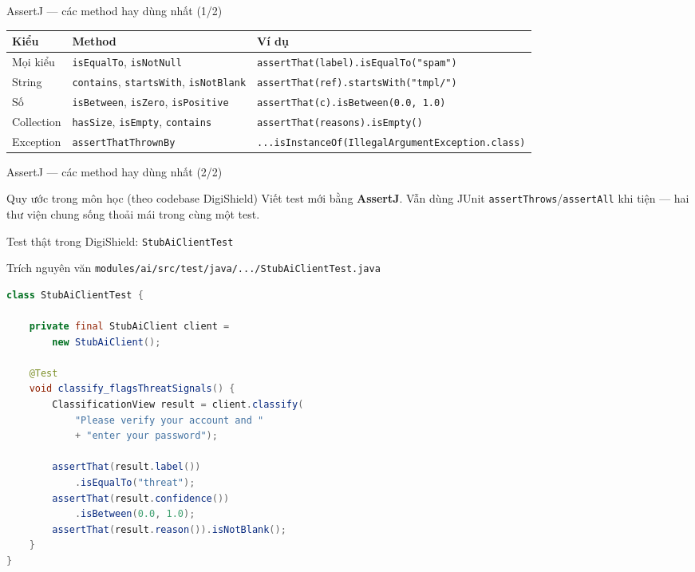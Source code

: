 \documentclass[aspectratio=169,12pt]{beamer}
\begin{document}
\begin{frame}{AssertJ --- các method hay dùng nhất (1/2)}
  \footnotesize
  \renewcommand{\arraystretch}{1.2}
  \setlength{\tabcolsep}{4pt}
  \begin{tabularx}{\textwidth}{l>{\raggedright\arraybackslash}X>{\raggedright\arraybackslash}X}
    \toprule
    \textbf{Kiểu} & \textbf{Method} & \textbf{Ví dụ} \\
    \midrule
    Mọi kiểu & \texttt{isEqualTo}, \texttt{isNotNull} & \texttt{assertThat(label)\allowbreak.isEqualTo("spam")} \\
    String & \texttt{contains}, \texttt{startsWith}, \texttt{isNotBlank} & \texttt{assertThat(ref)\allowbreak.startsWith("tmpl/")} \\
    Số & \texttt{isBetween}, \texttt{isZero}, \texttt{isPositive} & \texttt{assertThat(c)\allowbreak.isBetween(0.0, 1.0)} \\
    Collection & \texttt{hasSize}, \texttt{isEmpty}, \texttt{contains} & \texttt{assertThat(reasons)\allowbreak.isEmpty()} \\
    Exception & \texttt{assertThatThrownBy} & \texttt{...isInstanceOf(\allowbreak IllegalArgumentException\allowbreak.class)} \\
    \bottomrule
  \end{tabularx}
  \renewcommand{\arraystretch}{1}
\end{frame}

\begin{frame}{AssertJ --- các method hay dùng nhất (2/2)}
  \begin{block}{Quy ước trong môn học (theo codebase DigiShield)}
    Viết test mới bằng \textbf{AssertJ}. Vẫn dùng JUnit
    \texttt{assertThrows}/\texttt{assertAll} khi tiện --- hai thư viện
    chung sống thoải mái trong cùng một test.
  \end{block}
\end{frame}

\begin{frame}[fragile,shrink=8]{Test thật trong DigiShield: \texttt{StubAiClientTest}}
  \begin{block}{\small Trích nguyên văn \texttt{modules/ai/src/test/java/.../StubAiClientTest.java}}
\begin{lstlisting}[language=java]
class StubAiClientTest {

    private final StubAiClient client =
        new StubAiClient();

    @Test
    void classify_flagsThreatSignals() {
        ClassificationView result = client.classify(
            "Please verify your account and "
            + "enter your password");

        assertThat(result.label())
            .isEqualTo("threat");
        assertThat(result.confidence())
            .isBetween(0.0, 1.0);
        assertThat(result.reason()).isNotBlank();
    }
}
\end{lstlisting}
  \end{block}
\end{frame}
\end{document}
